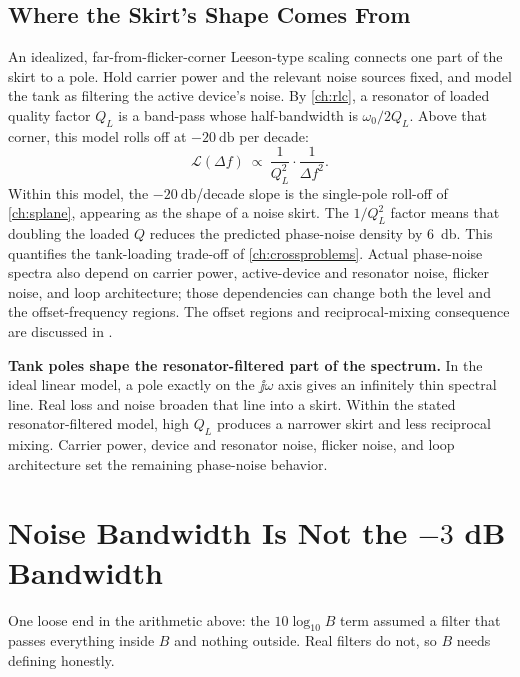 \subsection{Where the Skirt's Shape Comes From}
An idealized, far-from-flicker-corner Leeson-type scaling connects one part of the
skirt to a pole. Hold carrier power and the relevant noise sources fixed, and model the
tank as filtering the active device's noise. By \cref{ch:rlc}, a resonator of loaded
quality factor \(Q_L\) is a band-pass whose half-bandwidth is \(\omega_0/2Q_L\).
Above that corner, this model rolls off at \(-\SI{20}{\decibel}\) per decade:
\[
\mathcal{L}(\Delta f)\ \propto\ \frac{1}{Q_L^2}\cdot\frac{1}{\Delta f^{2}} .
\]
Within this model, the \(-\SI{20}{\decibel}\)/decade slope is the single-pole
roll-off of \cref{ch:splane}, appearing as the shape of a noise skirt. The
\(1/Q_L^2\) factor means that doubling the loaded \(Q\) reduces the predicted
phase-noise density by \SI{6}{\decibel}. This quantifies the tank-loading trade-off
of \cref{ch:crossproblems}. Actual phase-noise spectra also depend on carrier power,
active-device and resonator noise, flicker noise, and loop architecture; those
dependencies can change both the level and the offset-frequency regions. The offset
regions and reciprocal-mixing consequence are discussed in
\cite[pp.~245--250]{egan2003practical}.

\begin{controlsbox}
\textbf{Tank poles shape the resonator-filtered part of the spectrum.} In the ideal
linear model, a pole exactly on the \(\jj\omega\) axis gives an infinitely thin spectral
line. Real loss and noise broaden that line into a skirt. Within the stated
resonator-filtered model, high \(Q_L\) produces a narrower skirt and less reciprocal
mixing. Carrier power, device and resonator noise, flicker noise, and loop architecture
set the remaining phase-noise behavior.
\end{controlsbox}

\section{Noise Bandwidth Is Not the \texorpdfstring{\(-3\)}{-3} dB Bandwidth}
\label{sec:noisebw}
One loose end in the arithmetic above: the \(10\log_{10}B\) term assumed a filter that
passes everything inside \(B\) and nothing outside. Real filters do not, so \(B\) needs
defining honestly.

